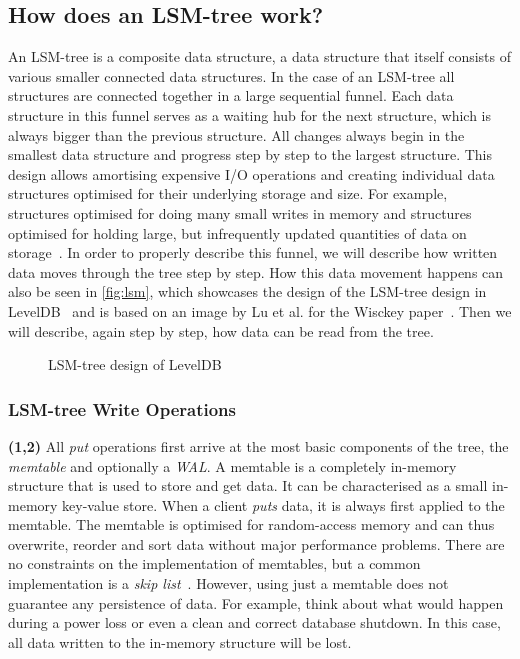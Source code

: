 \subsection{How does an LSM-tree work?}
\label{sec:lsmtree}
An LSM-tree is a composite data structure, a data structure that itself consists of various smaller connected data structures.
In the case of an LSM-tree all structures are connected together in a large sequential funnel. Each data structure in this funnel serves as a waiting hub for the next structure, which is always bigger than the previous structure. All changes always begin in the smallest data structure and progress step by step to the largest structure. This design allows amortising expensive I/O operations and creating individual data structures optimised for their underlying storage and size. For example, structures optimised for doing many small writes in memory and structures optimised for holding large, but infrequently updated quantities of data on storage~\cite{o1996log}. In order to properly describe this funnel, we will describe how written data moves through the tree step by step. How this data movement happens can also be seen in \autoref{fig:lsm}, which showcases the design of the LSM-tree design in LevelDB~\cite{ghemawat2011leveldb,LevelDB} and is based on an image by Lu et al. for the Wisckey paper~\cite{lu2017wisckey}. Then we will describe, again step by step, how data can be read from the tree.

\begin{figure}[h]
\centering
\begin{minipage}{0.75\textwidth}
  \centering
  
\end{minipage}%
\caption{ LSM-tree design of LevelDB }
\label{fig:lsm}
\end{figure}

\subsubsection{LSM-tree Write Operations}
\label{sec:background_lsm_writes}
\textbf{(1,2)} All \textit{put} operations first arrive at the most basic components of the tree, the \textit{memtable} and optionally a \textit{WAL}. A memtable is a completely in-memory structure that is used to store and get data. It can be characterised as a small in-memory key-value store. When a client \textit{puts} data, it is always first applied to the memtable. The memtable is optimised for random-access memory and can thus overwrite, reorder and sort data without major performance problems. There are no constraints on the implementation of memtables, but a common implementation is a \textit{skip list}~\cite{yeon2020jellyfish}. However, using just a memtable does not guarantee any persistence of data. For example, think about what would happen during a power loss or even a clean and correct database shutdown. In this case, all data written to the in-memory structure will be lost.


